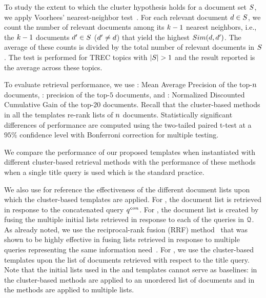 To study the extent to which the cluster hypothesis holds for a document set $S$, we apply Voorhees' nearest-neighbor test~\cite{Voorhees:85a}. 
For each relevant document $d \in S$, we count the number of relevant documents among its $k-1$ nearest neighbors, i.e., the $k-1$ documents $d' \in S$ ($d' \ne d$) that yield the highest $Sim(d,d')$. The average of these counts is divided by the total number of relevant documents in $S$. The test is performed for TREC topics with $|S| > 1$ and the result reported is the average across these topics.


To evaluate retrieval performance, we use \map: Mean Average Precision of the top-$n$ documents, \precFive: precision of the top-$5$ documents, and \ndcg: Normalized Discounted Cumulative Gain of the top-$20$ documents. Recall that the cluster-based methods in all the templates re-rank lists of $n$ documents. Statistically significant differences of performance are computed using the two-tailed paired t-test at a $95\%$ confidence level with Bonferroni correction for multiple testing.



We compare the performance of our proposed templates when instantiated
with different cluster-based retrieval methods with the performance
of these methods when a single title query is used which is the standard
practice.

We also use for reference the effectiveness of the
different document lists upon which the cluster-based templates are
applied.  For \queryCat, the document list is retrieved in response to
the concatenated query $q^{con}$. For \fuseClust, the document list is created
by fusing the multiple initial lists retrieved in response to each of
the queries in ${\mathcal Q}$. As already noted, we use the
reciprocal-rank fusion (RRF) method~\cite{Cormack+al:09a} that was shown to
be highly effective in fusing lists retrieved in response to multiple queries representing the same information need~\cite{bailey2017retrieval,bc17-adcs}. For \feature, we use
the cluster-based templates upon the list of documents
retrieved with respect to the title query.  Note that the initial
lists used in the \poolClust and \clustFuse templates cannot serve as
baselines: in \poolClust the cluster-based methods are applied to an
unordered list of documents and in \clustFuse the methods are applied
to multiple lists.

